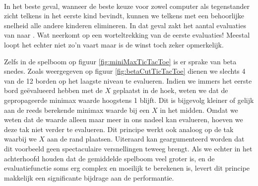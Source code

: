 \paragraph{}
In het beste geval, wanneer de beste keuze voor zowel computer als tegenstander zicht telkens in het eerste kind bevindt, kunnen we telkens met een behoorlijke snelheid alle andere kinderen elimineren. In dat geval zakt het aantal evaluaties van  naar . Wat neerkomt op een worteltrekking van de eerste evaluaties! Meestal loopt het echter niet zo'n vaart maar is de winst toch zeker opmerkelijk.
\begin{leftbar}
Zelfs in de spelboom op figuur \ref{fig:miniMaxTicTacToe} is er sprake van beta snedes. Zoals weergegeven op figuur \ref{fig:betaCutTicTacToe} dienen we slechts 4 van de 12 borden op het laagste niveau te evalueren. Indien we immers het eerste bord ge\"evalueerd hebben met de $X$ geplaatst in de hoek, weten we dat de gepropageerde minimax waarde hoogstens 1 blijft. Dit is bijgevolg kleiner of gelijk aan de reeds berekende minimax waarde bij een $X$ in het midden. Omdat we weten dat de waarde alleen maar meer in ons nadeel kan evalueren, hoeven we deze tak niet verder te evalueren. Dit principe werkt ook analoog op de tak waarbij we $X$ aan de rand plaatsen. Uiteraard kan geargumenteerd worden dat dit voorbeeld geen spectaculaire versnellingen teweeg brengt. Als we echter in het achterhoofd houden dat de gemiddelde spelboom veel groter is, en de evaluatiefunctie soms erg complex en moeilijk te berekenen is, levert dit principe makkelijk een significante bijdrage aan de performantie.
\end{leftbar}

